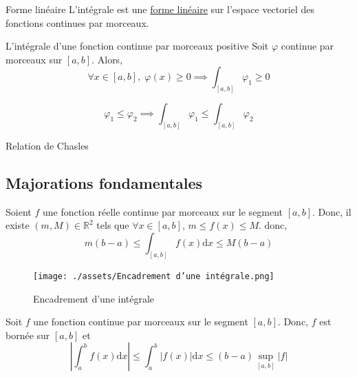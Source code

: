 \begin{Theorem}{Forme linéaire}{}
L'intégrale est une \underline{forme linéaire} sur l'{espace vectoriel des fonctions continues par morceaux}.
\end{Theorem}



\begin{Prop}{L'intégrale d'une fonction continue par morceaux positive}{}
  Soit $\varphi$ continue par morceaux sur $[a,b]$. Alors, 
  \begin{equation}
    \forall x \in [a,b], \; \varphi(x) \ge 0 \implies \int _{[a,b]} \varphi_1  \ge 0
  \end{equation}
\end{Prop}

\begin{Corollary}{}{}
\begin{equation}
  \varphi_1 \le \varphi_2 \implies \int _{[a,b]} \varphi_1 \le \int _{[a,b]} \varphi_2
\end{equation}
\end{Corollary}

\begin{Prop}{Relation de Chasles}{}

\end{Prop}



\subsection{Majorations fondamentales} %
\label{sub: Majorations fondamentales} %

\begin{Theorem}{}{}
  Soient $f$ une fonction réelle continue par morceaux sur le segment $[a,b]$. Donc, il existe $(m, M) \in \mathbb{R}^{2}$ tels que $\forall x \in [a,b]$, $m \le f(x) \le M$. donc, 
  \begin{equation}
    \boxed{m(b-a) \le \int _{[a,b]} f(x) \mathrm{d} x \le M(b-a)}
  \end{equation}

  \begin{figure}[H] %
    \centering
    \texttt{[image: ./assets/Encadrement d'une intégrale.png]}
    \caption{Encadrement d'une intégrale}
    \label{fig:Encadrement d'une intégrale.png}
  \end{figure}
\end{Theorem}

\begin{Theorem}{}{}
  Soit $f$ une fonction continue par morceaux sur le segment $[a,b]$. Donc, $f$ est bornée sur $[a,b]$ et 
  \begin{equation}
    \boxed{\left|\int_{a}^{b} f(x) \mathrm{d}x\right| \le \int_{a}^{b} |f(x)| \mathrm{d} x \le (b-a) \sup _{[a,b]}|f|}
  \end{equation}
\end{Theorem}

